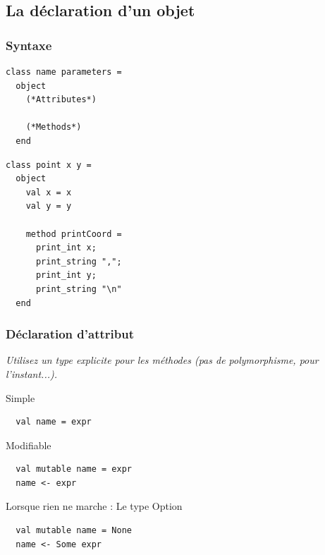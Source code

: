 \subsection{La déclaration d'un objet} %
\begin{frame}[fragile]
	\frametitle{Syntaxe}
	\begin{minipage}{0.45\textwidth}
		\lstset{basicstyle=\small}
		\begin{lstlisting}
class name parameters =
  object
    (*Attributes*)
    
    (*Methods*)
  end
		\end{lstlisting}
	\end{minipage}
	\begin{minipage}{0.4\textwidth}
		\begin{lstlisting}
class point x y =
  object
    val x = x
    val y = y

    method printCoord =
      print_int x;
      print_string ",";
      print_int y;
      print_string "\n"
  end
		\end{lstlisting}
	\end{minipage}
\end{frame}

\begin{frame}[fragile]
	\frametitle{Déclaration d'attribut}
	\textit{Utilisez un type explicite pour les méthodes (pas de polymorphisme, pour l'instant...).}\\
	\begin{block}{Simple}
		\begin{lstlisting}
  val name = expr
		\end{lstlisting}
	\end{block}
	\begin{block}{Modifiable}
		\begin{lstlisting}
  val mutable name = expr
  name <- expr
		\end{lstlisting}
	\end{block}
	\begin{block}{Lorsque rien ne marche : Le type Option}
		\begin{lstlisting}
  val mutable name = None
  name <- Some expr
		\end{lstlisting}
	\end{block}
\end{frame}

